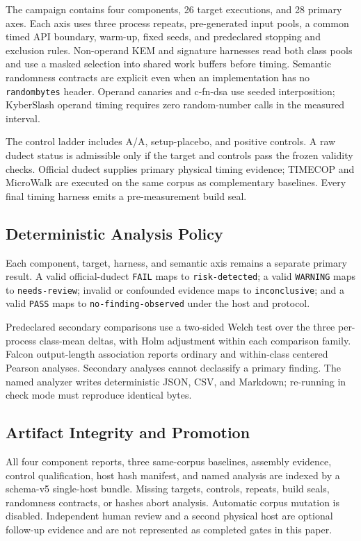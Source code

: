 \documentclass[cryptography,article,submit,moreauthors]{Definitions/mdpi}
\newcommand{\evidence}[1]{\texttt{#1}}
\begin{document}
The campaign contains four components, 26 target executions, and 28 primary
axes. Each axis uses three process repeats, pre-generated input pools, a common
timed API boundary, warm-up, fixed seeds, and predeclared stopping and
exclusion rules. Non-operand KEM and signature harnesses read both class pools
and use a masked selection into shared work buffers before timing. Semantic
randomness contracts are explicit even when an implementation has no
\texttt{randombytes} header. Operand canaries and c-fn-dsa use seeded
interposition; KyberSlash operand timing requires zero random-number calls in
the measured interval.

The control ladder includes A/A, setup-placebo, and positive controls. A raw
dudect status is admissible only if the target and controls pass the frozen
validity checks. Official dudect supplies primary physical timing evidence;
TIMECOP and MicroWalk are executed on the same corpus as complementary
baselines. Every final timing harness emits a pre-measurement build seal.



\subsection{Deterministic Analysis Policy}

Each component, target, harness, and semantic axis remains a separate primary
result. A valid official-dudect \texttt{FAIL} maps to
\evidence{risk-detected}; a valid \texttt{WARNING} maps to
\evidence{needs-review}; invalid or confounded evidence maps to
\evidence{inconclusive}; and a valid \texttt{PASS} maps to
\evidence{no-finding-observed} under the host and protocol.

Predeclared secondary comparisons use a two-sided Welch test over the three
per-process class-mean deltas, with Holm adjustment within each comparison
family. Falcon output-length association reports ordinary and within-class
centered Pearson analyses. Secondary analyses cannot declassify a primary
finding. The named analyzer writes deterministic JSON, CSV, and Markdown;
re-running in check mode must reproduce identical bytes.

\subsection{Artifact Integrity and Promotion}

All four component reports, three same-corpus baselines, assembly evidence,
control qualification, host hash manifest, and named analysis are indexed by a
schema-v5 single-host bundle. Missing targets, controls, repeats, build seals,
randomness contracts, or hashes abort analysis. Automatic corpus mutation is
disabled. Independent human review and a second physical host are optional
follow-up evidence and are not represented as completed gates in this paper.
\end{document}
